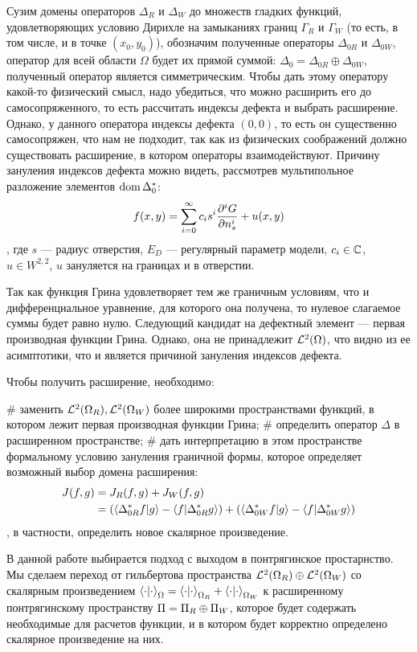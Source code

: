 Сузим домены операторов $\Delta_R$ и $\Delta_W$ до множеств гладких функций, удовлетворяющих условию Дирихле на замыканиях границ $\Gamma_R$ и $\Gamma_W$ (то есть, в том числе, и в точке $(x_0, y_0)$), обозначим полученные операторы $\Delta_{0R}$ и $\Delta_{0W}$, оператор для всей области $\Omega$ будет их прямой суммой: $\Delta_0 = \Delta_{0R} \oplus \Delta_{0W}$, полученный оператор является симметрическим. Чтобы дать этому оператору какой-то физический смысл, надо убедиться, что можно расширить его до самосопряженного, то есть рассчитать индексы дефекта и выбрать расширение. Однако, у данного оператора индексы дефекта $(0, 0)$, то есть он существенно самосопряжен, что нам не подходит, так как из физических соображений должно существовать расширение, в котором операторы взаимодействуют. Причину зануления индексов дефекта можно видеть, рассмотрев мультипольное разложение элементов $\operatorname{dom} \Delta_0^*$:
\[
f(x, y) = \sum\limits_{i = 0}^\infty c_i s^i \pdv[i]{G}{n_s} (x, y, x_0, y_0; E_D) + u(x, y)
\]
, где $s$ — радиус отверстия, $E_D$ — регулярный параметр модели, $c_i \in \mathbb{C}$, $u \in W^{2, 2}$, $u$ зануляется на границах и в отверстии.

Так как функция Грина удовлетворяет тем же граничным условиям, что и дифференциальное уравнение, для которого она получена, то нулевое слагаемое суммы будет равно нулю. Следующий кандидат на дефектный элемент — первая производная функции Грина. Однако, она не принадлежит $\mathcal{L}^2(\Omega)$, что видно из ее асимптотики, что и является причиной зануления индексов дефекта.

Чтобы получить расширение, необходимо:
\begin{ilist}
# заменить $\mathcal{L}^2(\Omega_R), \mathcal{L}^2(\Omega_W)$ более широкими пространствами функций, в котором лежит первая производная функции Грина;
# определить оператор $\Delta$ в расширенном пространстве;
# дать интерпретацию в этом пространстве формальному условию зануления граничной формы, которое определяет возможный выбор домена расширения:
\begin{align*}
J(f, g)
& = J_R(f, g) + J_W(f, g) \\
& = (\ip{\Delta_{0R}^* f}{g} - \ip{f}{\Delta_{0R}^* g}) + (\ip{\Delta_{0W}^* f}{g} - \ip{f}{\Delta_{0W}^* g})
\end{align*}
, в частности, определить новое скалярное произведение.
\end{ilist}
В данной работе выбирается подход с выходом в понтрягинское простарнство. Мы сделаем переход от гильбертова пространства $\mathcal{L}^2(\Omega_R) \oplus \mathcal{L}^2(\Omega_W)$ со скалярным произведением $\ipcdot_\Omega = \ipcdot_{\Omega_R} + \ipcdot_{\Omega_W}$ к расширенному понтрягинскому пространству $\Pi = \Pi_R \oplus \Pi_W$, которое будет содержать необходимые для расчетов функции, и в котором будет корректно определено скалярное произведение на них.

